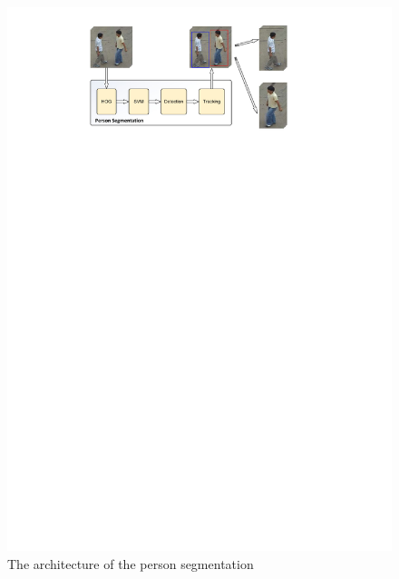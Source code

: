 \begin{figure}
	\includegraphics[trim=2cm 23cm 0cm 1cm]{fig01/person_detection.pdf}
	\caption{The architecture of the person segmentation}
	\label{fig:person_detection}
\end{figure}

